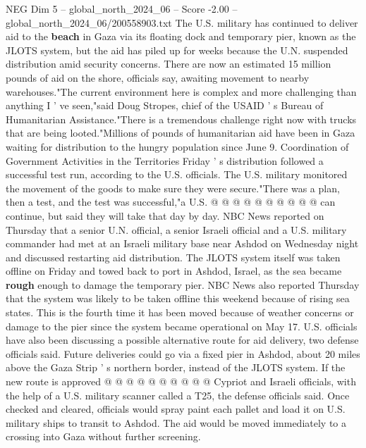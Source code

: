 \begin{textsample}{NEG Dim 5 – global\_north\_2024\_06 – Score -2.00 – global\_north\_2024\_06/200558903.txt}  \label{ex:f5_neg_082}
The U.S. military has continued to deliver aid to the \textbf{beach} in Gaza via its floating dock and temporary pier, known as the JLOTS system, but the aid has piled up for weeks because the U.N. suspended distribution amid security concerns.
There are now an estimated 15 million pounds of aid on the shore, officials say, awaiting movement to nearby warehouses."The current environment here is complex and more challenging than anything I ' ve seen,"said Doug Stropes, chief of the USAID ' s Bureau of Humanitarian Assistance."There is a tremendous challenge right now with trucks that are being looted."Millions of pounds of humanitarian aid have been in Gaza waiting for distribution to the hungry population since June 9.
Coordination of Government Activities in the Territories Friday ' s distribution followed a successful test run, according to the U.S. officials.
The U.S. military monitored the movement of the goods to make sure they were secure."There was a plan, then a test, and the test was successful,"a U.S. @ @ @ @ @ @ @ @ @ @ can continue, but said they will take that day by day.
NBC News reported on Thursday that a senior U.N. official, a senior Israeli official and a U.S. military commander had met at an Israeli military base near Ashdod on Wednesday night and discussed restarting aid distribution.
The JLOTS system itself was taken offline on Friday and towed back to port in Ashdod, Israel, as the sea became \textbf{rough} enough to damage the temporary pier.
NBC News also reported Thursday that the system was likely to be taken offline this weekend because of rising sea states.
This is the fourth time it has been moved because of weather concerns or damage to the pier since the system became operational on May 17.
U.S. officials have also been discussing a possible alternative route for aid delivery, two defense officials said.
Future deliveries could go via a fixed pier in Ashdod, about 20 miles above the Gaza Strip ' s northern border, instead of the JLOTS system.
If the new route is approved @ @ @ @ @ @ @ @ @ @ Cypriot and Israeli officials, with the help of a U.S. military scanner called a T25, the defense officials said.
Once checked and cleared, officials would spray paint each pallet and load it on U.S. military ships to transit to Ashdod.
The aid would be moved immediately to a crossing into Gaza without further screening.

\end{textsample}
